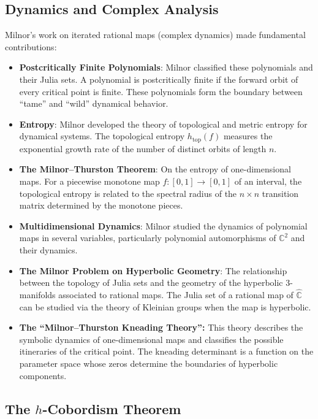 \subsection{Dynamics and Complex Analysis}

Milnor's work on iterated rational maps (complex dynamics) made fundamental contributions:
\begin{itemize}
\item \textbf{Postcritically Finite Polynomials}: Milnor classified these polynomials and their Julia sets. A polynomial is postcritically finite if the forward orbit of every critical point is finite. These polynomials form the boundary between ``tame'' and ``wild'' dynamical behavior.
\item \textbf{Entropy}: Milnor developed the theory of topological and metric entropy for dynamical systems. The topological entropy $h_{\text{top}}(f)$ measures the exponential growth rate of the number of distinct orbits of length $n$.
\item \textbf{The Milnor--Thurston Theorem}: On the entropy of one-dimensional maps. For a piecewise monotone map $f: [0,1] \to [0,1]$ of an interval, the topological entropy is related to the spectral radius of the $n \times n$ transition matrix determined by the monotone pieces.
\item \textbf{Multidimensional Dynamics}: Milnor studied the dynamics of polynomial maps in several variables, particularly polynomial automorphisms of $\mathbb{C}^2$ and their dynamics.
\item \textbf{The Milnor Problem on Hyperbolic Geometry}: The relationship between the topology of Julia sets and the geometry of the hyperbolic 3-manifolds associated to rational maps. The Julia set of a rational map of $\hat{\mathbb{C}}$ can be studied via the theory of Kleinian groups when the map is hyperbolic.
\item \textbf{The ``Milnor--Thurston Kneading Theory'':} This theory describes the symbolic dynamics of one-dimensional maps and classifies the possible itineraries of the critical point. The kneading determinant is a function on the parameter space whose zeros determine the boundaries of hyperbolic components.
\end{itemize}

\subsection{The \texorpdfstring{$h$}{h}-Cobordism Theorem}

